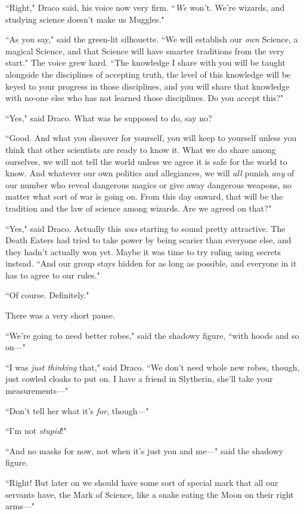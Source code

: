 ``Right," Draco said, his voice now very firm. ``\emph{We} won't. We're wizards, and studying science doesn't make us Muggles."

``As you say," said the green-lit silhouette. ``We will establish our \emph{own} Science, a magical Science, and that Science will have smarter traditions from the very start." The voice grew hard. ``The knowledge I share with you will be taught alongside the disciplines of accepting truth, the level of this knowledge will be keyed to your progress in those disciplines, and you will share that knowledge with no-one else who has not learned those disciplines. Do you accept this?"

``Yes," said Draco. What was he supposed to do, say no?

``Good. And what you discover for yourself, you will keep to yourself unless you think that other scientists are ready to know it. What we do share among ourselves, we will not tell the world unless we agree it is safe for the world to know. And whatever our own politics and allegiances, we will \emph{all} punish \emph{any} of our number who reveal dangerous magics or give away dangerous weapons, no matter what sort of war is going on. From this day onward, that will be the tradition and the law of science among wizards. Are we agreed on that?"

``Yes," said Draco. Actually this \emph{was} starting to sound pretty attractive. The Death Eaters had tried to take power by being scarier than everyone else, and they hadn't actually won yet. Maybe it was time to try ruling using secrets instead. ``And our group stays hidden for as long as possible, and everyone in it has to agree to our rules."

``Of course. Definitely."

There was a very short pause.

``We're going to need better robes," said the shadowy figure, ``with hoods and so on—"

``I was \emph{just thinking} that," said Draco. ``We don't need whole new robes, though, just cowled cloaks to put on. I have a friend in Slytherin, she'll take your measurements—"

``Don't tell her what it's \emph{for}, though—"

``I'm not \emph{stupid}!"

``And no masks for now, not when it's just you and me—" said the shadowy figure.

``Right! But later on we should have some sort of special mark that all our servants have, the Mark of Science, like a snake eating the Moon on their right arms—"

